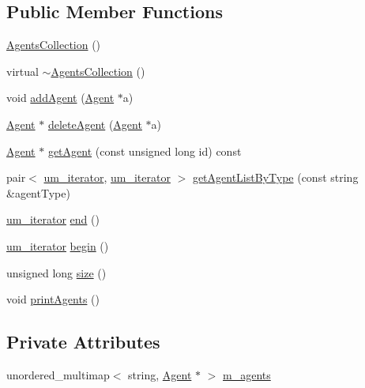 \subsection*{Public Member Functions}
\begin{DoxyCompactItemize}
\item 
\mbox{\hyperlink{class_agents_collection_a866b0ed56c0109e82bc7c839de0a3267}{Agents\+Collection}} ()
\item 
virtual \mbox{\hyperlink{class_agents_collection_a8a58eb1f8a45cc4d1c0e04dd912dbae0}{$\sim$\+Agents\+Collection}} ()
\item 
void \mbox{\hyperlink{class_agents_collection_a51d14d0635dedd5971ea90dec4f9e7f3}{add\+Agent}} (\mbox{\hyperlink{class_agent}{Agent}} $\ast$a)
\item 
\mbox{\hyperlink{class_agent}{Agent}} $\ast$ \mbox{\hyperlink{class_agents_collection_afd4d2e005b5e449637abd0fa022132a9}{delete\+Agent}} (\mbox{\hyperlink{class_agent}{Agent}} $\ast$a)
\item 
\mbox{\hyperlink{class_agent}{Agent}} $\ast$ \mbox{\hyperlink{class_agents_collection_a4b6b57c50d715edb3404520cfdb32688}{get\+Agent}} (const unsigned long id) const
\item 
pair$<$ \mbox{\hyperlink{_agents_collection_8h_afde47bc45d604b8b8c72755072376679}{um\+\_\+iterator}}, \mbox{\hyperlink{_agents_collection_8h_afde47bc45d604b8b8c72755072376679}{um\+\_\+iterator}} $>$ \mbox{\hyperlink{class_agents_collection_a4ab0c8e86e6f6ebceb12bd2bd8f9f758}{get\+Agent\+List\+By\+Type}} (const string \&agent\+Type)
\item 
\mbox{\hyperlink{_agents_collection_8h_afde47bc45d604b8b8c72755072376679}{um\+\_\+iterator}} \mbox{\hyperlink{class_agents_collection_afc61b751cf3387ab4a1bf0dfbc29cb82}{end}} ()
\item 
\mbox{\hyperlink{_agents_collection_8h_afde47bc45d604b8b8c72755072376679}{um\+\_\+iterator}} \mbox{\hyperlink{class_agents_collection_abc1d6593a3ed1c1c7b2d31b7efec8db8}{begin}} ()
\item 
unsigned long \mbox{\hyperlink{class_agents_collection_a3226f7eb58b11623bdb353d8938f60d3}{size}} ()
\item 
void \mbox{\hyperlink{class_agents_collection_a193faf9793030715e8edeb65137156e9}{print\+Agents}} ()
\end{DoxyCompactItemize}
\subsection*{Private Attributes}
\begin{DoxyCompactItemize}
\item 
unordered\+\_\+multimap$<$ string, \mbox{\hyperlink{class_agent}{Agent}} $\ast$ $>$ \mbox{\hyperlink{class_agents_collection_a35a5728b0e0108c2f37897720c904dd1}{m\+\_\+agents}}
\end{DoxyCompactItemize}


